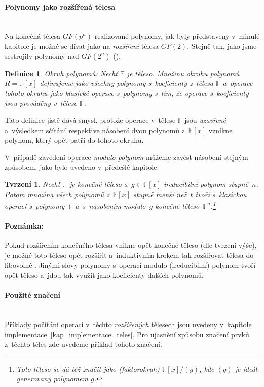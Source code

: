 \documentclass[thesis=M,czech,hidelinks]{FITthesis}[2012/06/26]
\newcommand{\0}{{\textcolor[gray]{0.75}{0}}}
\newtheorem{tvrzeni}{Tvrzení}
\newtheorem{definice}{Definice}
\begin{document}
\paragraph{Polynomy jako rozšířená tělesa} \hfil \\
Na konečná tělesa $GF(p^n)$ realizované polynomy, jak byly představeny v~minulé
kapitole je možné se dívat jako na \emph{rozšíření} tělesa $GF(2)$. Stejně tak,
jako jsme sestrojily polynomy nad $GF(2^n)$ ().

\begin{definice}{Okruh polynomů:}
    Nechť $\mathbb{F}$ je těleso. Množinu okruhu polynomů $R = \mathbb{F}[x]$
    definujeme jako všechny polynomy s~koeficienty z~tělesa $\mathbb{F}$
    a~operace tohoto okruhu jako klasické operace s~polynomy s~tím, že operace
    s~koeficienty jsou prováděny v~tělese $\mathbb{F}$.
\end{definice}

Tato definice jistě dává smysl, protože operace v~tělese $\mathbb{F}$ jsou
\emph{uzavřené} a~výsledkem sčítání respektive násobení dvou polynomů
z~$\mathbb{F}[x]$ vznikne polynom, který opět patří do tohoto okruhu.

V~případě zavedení operace \emph{modulo polynom} můžeme zavést násobení stejným
způsobem, jako bylo uvedeno v~předešlé kapitole.

\begin{tvrzeni}
    Nechť $\mathbb{F}$ je konečné těleso a~$g \in \mathbb{F}[x]$ \emph{ireducibilní}
    polynom stupně~$n$. Potom množina všech polynomů z~$\mathbb{F}[x]$ stupně
    menší než~$t$ tvoří s~klasickou operací s~polynomy $+$ a~s~násobením
    modulo~$g$ \emph{konečné těleso}~$\mathbb{F}^n$.\footnote{
        Toto těleso se dá též značit jako (faktorokruh) $\mathbb{F}[x]/(g)$, kde
        $(g)$ je \emph{ideál} generovaný polynomem $g$.
    }
\end{tvrzeni}


\paragraph{Poznámka:} Pokud rozšířením konečného tělesa vnikne opět konečné
těleso (dle tvrzení výše), je možné toto těleso opět rozšířit a~induktivním
krokem tak rozšiřovat tělesa do libovolné . Jinými slovy polynomy
s~operací modulo (ireducibilní) polynom tvoří opět těleso a~jdou tak využít jako
koeficienty dalších polynomů.


\paragraph{Použité značení} \hfil \\
Příklady počítání operací v~těchto \emph{rozšířených} tělesech jsou uvedeny
v~kapitole implementace~\ref{kap_implementace_teles}. Pro ujasnění způsobu
značení prvků z~těchto těles zde uvedeme příklad tohoto značení.
\end{document}
